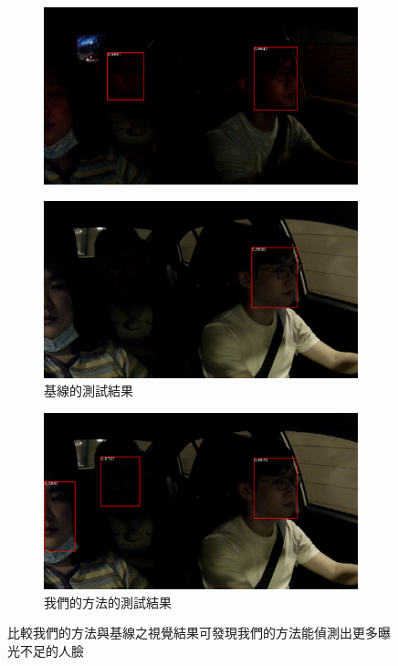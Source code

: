 \begin{figure}[t]
\begin{subfigure}[b]{0.45\textwidth}
\end{subfigure}
\begin{subfigure}[b]{0.45\textwidth}
    \includegraphics[width=\textwidth]{figures/comp_ours5}
\end{subfigure}
\begin{subfigure}[b]{0.45\textwidth}
    \includegraphics[width=\textwidth]{figures/comp_base6}
    \caption {基線的測試結果}
\end{subfigure}
\begin{subfigure}[b]{0.45\textwidth}
    \includegraphics[width=\textwidth]{figures/comp_ours6}
    \caption {我們的方法的測試結果}
\end{subfigure}
\caption[我們的方法與基線之視覺結果比較]{比較我們的方法與基線之視覺結果可發現我們的方法能偵測出更多曝光不足的人臉}
\label{fig:comp_with_base}
\end{figure}

